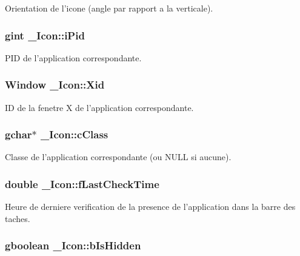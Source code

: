 Orientation de l'icone (angle par rapport a la verticale). 

\subsubsection{\setlength{\rightskip}{0pt plus 5cm}gint {\bf \_\-Icon::iPid}}\label{struct__Icon_f3b6afeb6207d6efd48f494823c4e8fa}


PID de l'application correspondante. 

\subsubsection{\setlength{\rightskip}{0pt plus 5cm}Window {\bf \_\-Icon::Xid}}\label{struct__Icon_6f21902debcba6a03a884d60fb131e2e}


ID de la fenetre X de l'application correspondante. 

\subsubsection{\setlength{\rightskip}{0pt plus 5cm}gchar$\ast$ {\bf \_\-Icon::cClass}}\label{struct__Icon_5b779d58aeebeedf08bb06131a871e9b}


Classe de l'application correspondante (ou NULL si aucune). 

\subsubsection{\setlength{\rightskip}{0pt plus 5cm}double {\bf \_\-Icon::fLastCheckTime}}\label{struct__Icon_a615848185216245e435335c50a84edb}


Heure de derniere verification de la presence de l'application dans la barre des taches. 

\subsubsection{\setlength{\rightskip}{0pt plus 5cm}gboolean {\bf \_\-Icon::bIsHidden}}\label{struct__Icon_ec7e3513e8e070992c131a08f80819d2}


